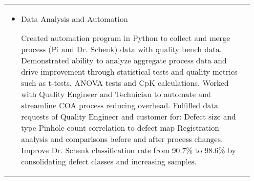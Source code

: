 \documentclass[a4paper, oneside, final, fontsize=9pt, usegeometry]{scrartcl} %
\begin{document}
\begin{center}
\begin{tabularx}{0.97\linewidth}{XX}
\begin{itemize}
\begin{sloppypar}
			\end{sloppypar}
			                               \item{Data Analysis and Automation}
			                               \begin{sloppypar}
				Created automation program in Python to collect and merge process (Pi and Dr. Schenk) data with quality bench data. Demonstrated ability to analyze aggregate process data and drive improvement through statistical tests and quality metrics such as t-tests, ANOVA tests and CpK calculations. Worked with Quality Engineer and Technician to automate and streamline COA process reducing overhead. Fulfilled data requests of Quality Engineer and customer for: Defect size and type Pinhole count correlation to defect map Registration analysis and comparisons before and after process changes. Improve Dr. Schenk classification rate from 90.7\% to 98.6\% by consolidating defect classes and increasing samples.
			\end{sloppypar}
		                               \end{itemize}
	\end{tabularx}

	\vspace{-8pt}


\end{center}
\end{document}
